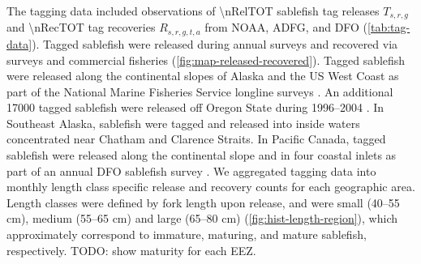 \documentclass{article}
\newcommand{\lr}[1]{{\color{blue}#1}}
\begin{document}
The tagging data included observations of \num{\nRelTOT} sablefish tag releases $T_{s,r,g}$ and \num{\nRecTOT} tag recoveries $R_{s,r,g,t,a}$ from NOAA, ADFG, and DFO (\autoref{tab:tag-data}). Tagged sablefish were released during annual surveys and recovered via surveys and commercial fisheries  (\autoref{fig:map-released-recovered}). Tagged sablefish were released along the continental slopes of Alaska and the US West Coast as part of the National Marine Fisheries Service longline surveys \cite[]{sigler2000, lunsford2014}. An additional \num{17000} tagged sablefish were released off Oregon State during 1996--2004 \cite[described in][]{sogard2017}. In Southeast Alaska, sablefish were tagged and released into inside waters concentrated near Chatham and Clarence Straits. In Pacific Canada, tagged sablefish were released along the continental slope and in four coastal inlets as part of an annual DFO sablefish survey \cite[]{wyeth2007, lacko2020}. We aggregated tagging data into monthly length class specific release and recovery counts for each geographic area. Length classes were defined by fork length upon release, and were small (40--55 cm), medium (55--65 cm) and large (65--80 cm) (\autoref{fig:hist-length-region}), which approximately correspond to immature, maturing, and mature sablefish, respectively. \lr{TODO: show maturity for each EEZ.}
\end{document}
